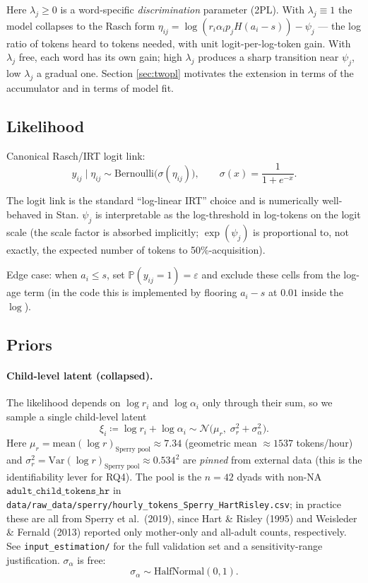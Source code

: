\documentclass[11pt]{article}
\newcommand{\Var}{\mathrm{Var}}
\newcommand{\Prob}{\mathbb{P}}
\newcommand{\Bern}{\mathrm{Bernoulli}}
\newcommand{\Norm}{\mathcal{N}}
\newcommand{\HN}{\mathrm{HalfNormal}}
\newcommand{\sigmoid}{\sigma}
\begin{document}
Here \(\lambda_j \ge 0\) is a word-specific \emph{discrimination} parameter
(2PL). With \(\lambda_j \equiv 1\) the model collapses to the Rasch form
\(\eta_{ij} = \log(r_i \alpha_i p_j H (a_i - s)) - \psi_j\) — the log
ratio of tokens heard to tokens needed, with unit logit-per-log-token
gain. With \(\lambda_j\) free, each word has its own gain; high
\(\lambda_j\) produces a sharp transition near \(\psi_j\), low
\(\lambda_j\) a gradual one. Section \ref{sec:twopl} motivates the
extension in terms of the accumulator and in terms of model fit.

\subsection{Likelihood}

Canonical Rasch/IRT logit link:
\begin{equation}
y_{ij} \mid \eta_{ij} \sim \Bern\big(\sigmoid(\eta_{ij})\big),
\qquad \sigmoid(x) = \frac{1}{1 + e^{-x}}.
\label{eq:likelihood}
\end{equation}

The logit link is the standard ``log-linear IRT'' choice and is
numerically well-behaved in Stan. \(\psi_j\) is interpretable as the
log-threshold in log-tokens on the logit scale (the scale factor is
absorbed implicitly; \(\exp(\psi_j)\) is proportional to, not exactly,
the expected number of tokens to 50\%-acquisition).

Edge case: when \(a_i \le s\), set \(\Prob(y_{ij}=1) = \varepsilon\) and
exclude these cells from the log-age term (in the code this is
implemented by flooring $a_i - s$ at $0.01$ inside the $\log$).

\subsection{Priors}

\paragraph{Child-level latent (collapsed).}
The likelihood depends on \(\log r_i\) and \(\log \alpha_i\) only through
their sum, so we sample a single child-level latent
\[ \xi_i \coloneqq \log r_i + \log \alpha_i \sim \Norm\!\big(\mu_r,\; \sigma_r^2 + \sigma_\alpha^2\big). \]
Here \(\mu_r = \mathrm{mean}(\log r)_{\text{Sperry pool}} \approx 7.34\)
(geometric mean \(\approx 1537\) tokens/hour) and
\(\sigma_r^2 = \Var(\log r)_{\text{Sperry pool}} \approx 0.534^2\) are
\emph{pinned} from external data (this is the identifiability lever
for RQ4). The pool is the \(n=42\) dyads with non-NA
\(\texttt{adult\_child\_tokens\_hr}\) in
\texttt{data/raw\_data/sperry/hourly\_tokens\_Sperry\_HartRisley.csv}; in
practice these are all from Sperry et al.\ (2019), since Hart \& Risley
(1995) and Weisleder \& Fernald (2013) reported only mother-only and
all-adult counts, respectively. See \texttt{input\_estimation/} for the
full validation set and a sensitivity-range justification.
\(\sigma_\alpha\) is free:
\begin{equation}
\sigma_\alpha \sim \HN(0, 1).
\end{equation}
\end{document}
